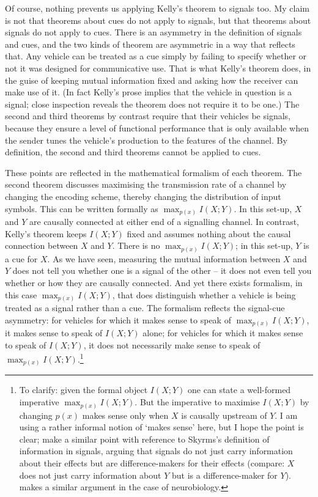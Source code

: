 \documentclass[12pt]{article}
\begin{document}
Of course, nothing prevents us applying Kelly's theorem to signals too.
My claim is not that theorems about cues do not apply to signals, but that theorems about signals do not apply to cues.
There is an asymmetry in the definition of signals and cues, and the two kinds of theorem are asymmetric in a way that reflects that.
Any vehicle can be treated as a cue simply by failing to specify whether or not it was designed for communicative use.
That is what Kelly's theorem does, in the guise of keeping mutual information fixed and asking how the receiver can make use of it.
(In fact Kelly's prose implies that the vehicle in question is a signal; close inspection reveals the theorem does not require it to be one.)
The second and third theorems by contrast require that their vehicles be signals, because they ensure a level of functional performance that is only available when the sender tunes the vehicle's production to the features of the channel.
By definition, the second and third theorems cannot be applied to cues.

These points are reflected in the mathematical formalism of each theorem.
The second theorem discusses maximising the transmission rate of a channel by changing the encoding scheme, thereby changing the distribution of input symbols.
This can be written formally as $\max_{p(x)}I(X;Y)$.
In this set-up, $X$ and $Y$ are causally connected at either end of a signalling channel.
In contrast, Kelly's theorem keeps $I(X;Y)$ fixed and assumes nothing about the causal connection between $X$ and $Y$.
There is no $\max_{p(x)}I(X;Y)$; in this set-up, $Y$ is a cue for $X$.
As we have seen, measuring the mutual information between $X$ and $Y$ does not tell you whether one is a signal of the other -- it does not even tell you whether or how they are causally connected.
And yet there exists formalism, in this case $\max_{p(x)}I(X;Y)$, that does distinguish whether a vehicle is being treated as a signal rather than a cue.
The formalism reflects the signal-cue asymmetry: for vehicles for which it makes sense to speak of $\max_{p(x)}I(X;Y)$, it makes sense to speak of $I(X;Y)$ alone; for vehicles for which it makes sense to speak of $I(X;Y)$, it does not necessarily make sense to speak of $\max_{p(x)}I(X;Y)$.\footnote{To clarify: given the formal object $I(X;Y)$ one can state a well-formed imperative $\max_{p(x)}I(X;Y)$. But the imperative to maximise $I(X;Y)$ by changing $p(x)$ makes sense only when $X$ is causally upstream of $Y$. I am using a rather informal notion of `makes sense' here, but I hope the point is clear; \citet{calcott2020signals} make a similar point with reference to Skyrms's \citeyearpar{skyrms2010signals} definition of information in signals, arguing that signals do not just carry information about their effects but are difference-makers for their effects (compare: $X$ does not just carry information about $Y$ but is a difference-maker for $Y$). 
\citet{rathkopf2017neural} makes a similar argument in the case of neurobiology.}
\end{document}
